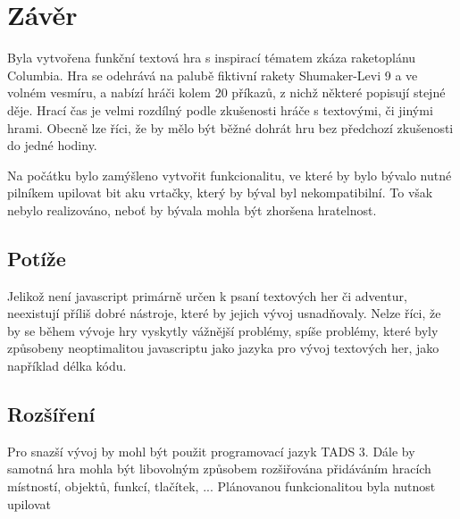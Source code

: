 \documentclass[main.tex]{subfiles}
\begin{document}
\section{Závěr}
Byla vytvořena funkční textová hra s inspirací tématem zkáza raketoplánu Columbia. Hra se odehrává na palubě fiktivní rakety Shumaker-Levi 9 a ve volném vesmíru, a nabízí hráči kolem 20 příkazů, z nichž některé popisují stejné děje. Hrací čas je velmi rozdílný podle zkušenosti hráče s textovými, či jinými hrami. Obecně lze říci, že by mělo být běžné dohrát hru bez předchozí zkušenosti do jedné hodiny. 

Na počátku bylo zamýšleno vytvořit funkcionalitu, ve které by bylo bývalo nutné pilníkem upilovat bit aku vrtačky, který by býval byl nekompatibilní. To však nebylo realizováno, neboť by bývala mohla být zhoršena hratelnost.

\subsection{Potíže}
Jelikož není javascript primárně určen k psaní textových her či adventur, neexistují příliš dobré nástroje, které by jejich vývoj usnadňovaly. Nelze říci, že by se během vývoje hry vyskytly vážnější problémy, spíše problémy, které byly způsobeny neoptimalitou javascriptu jako jazyka pro vývoj textových her, jako například délka kódu.

\subsection{Rozšíření} 
Pro snazší vývoj by mohl být použit programovací jazyk TADS 3. Dále by samotná hra mohla být libovolným způsobem rozšiřována přidáváním hracích místností, objektů, funkcí, tlačítek, ... Plánovanou funkcionalitou byla nutnost upilovat
\end{document}
